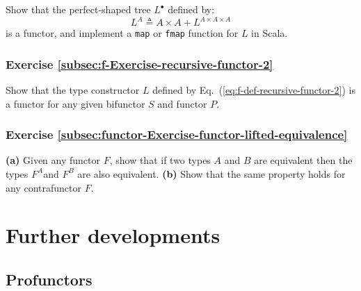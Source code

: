 Show that the perfect-shaped tree $L^{\bullet}$ defined by:
\[
L^{A}\triangleq A\times A+L^{A\times A\times A}
\]
is a functor, and implement a \lstinline!map! or \lstinline!fmap!
function for $L$ in Scala.

\subsubsection{Exercise \label{subsec:f-Exercise-recursive-functor-2}\ref{subsec:f-Exercise-recursive-functor-2}}

Show that the type constructor $L$ defined by Eq.~(\ref{eq:f-def-recursive-functor-2})
is a functor for any given bifunctor $S$ and functor $P$. 

\subsubsection{Exercise \label{subsec:functor-Exercise-functor-lifted-equivalence}\ref{subsec:functor-Exercise-functor-lifted-equivalence}}

\textbf{(a)} Given any functor $F$, show that if two types $A$ and
$B$ are equivalent then the types $F^{A}$and $F^{B}$ are also equivalent.
\textbf{(b)} Show that the same property holds for any contrafunctor
$F$.

\section{Further developments}

\subsection{Profunctors\label{subsec:f-Profunctors}}

